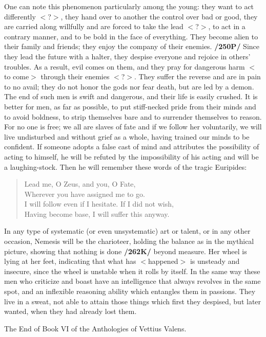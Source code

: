 One can note this phenomenon particularly among the young: they want to act differently $<$?$>$, they hand over to another the control over bad or good, they are carried along willfully and are forced to take the lead $<$?$>$, to act in a contrary manner, and to be bold in the face of everything. They become alien to their family and friends; they enjoy the company of their enemies. \textbf{/250P/} Since they lead the future with a halter, they despise everyone and rejoice in others’ troubles. As a result, evil comes on them, and they pray for dangerous harm $<$to come$>$ through their enemies $<$?$>$. They suffer the reverse and are in pain to no avail; they do not honor the gods nor fear death, but are led by a demon. The end of such men is swift and
dangerous, and their life is easily crushed.  It is better for men, as far as possible, to put stiff-necked pride from their minds and to avoid boldness, to strip themselves bare and to surrender themselves to reason. For no one is free; we all are slaves of fate and if we follow her voluntarily, we will live undisturbed and without grief as a whole, having trained our minds to be confident. If someone adopts a false cast of mind and attributes the possibility of acting to himself, he will be refuted by the impossibility of his acting and will be a laughing-stock. Then he will remember these words of the tragic Euripides:

\begin{verse}
Lead me, O Zeus, and you, O Fate, \\
Wherever you have assigned me to go.\\
I will follow even if I hesitate. If I did not wish, \\
Having become base, I will suffer this anyway. \\
\end{verse}

In any type of systematic (or even unsystematic) art or talent, or in any other occasion, Nemesis will be the charioteer, holding the balance as in the mythical picture, showing that nothing is done \textbf{/262K/}
beyond measure. Her wheel is lying at her feet, indicating that what has $<$happened$>$ is unsteady and insecure, since the wheel is unstable when it rolls by itself. In the same way these men who criticize and boast have an intelligence that always revolves in the same spot, and an inflexible reasoning ability which entangles them in passions. They live in a sweat, not able to attain those things which first they despised, but later wanted, when they had already lost them.

The End of Book VI of the Anthologies of Vettius Valens.

\newpage